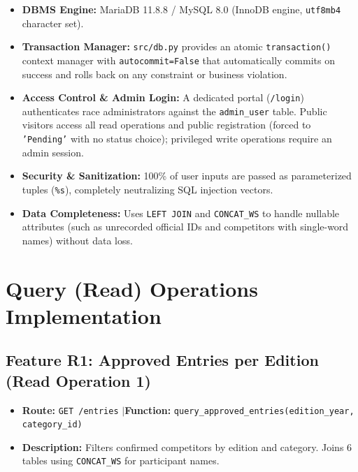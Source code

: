 \documentclass[11pt,a4paper]{article}
\begin{document}
\begin{tcolorbox}[colback=gray!5!white, colframe=darkgray, title=\textbf{Database Environment \& Connection Architecture}, fonttitle=\bfseries\small]
\small
\begin{itemize}[leftmargin=1.5em, itemsep=1.5pt, topsep=1pt]
  \item \textbf{DBMS Engine:} MariaDB 11.8.8 / MySQL 8.0 (InnoDB engine, \texttt{utf8mb4} character set).
  \item \textbf{Transaction Manager:} \texttt{src/db.py} provides an atomic \texttt{transaction()} context manager with \texttt{autocommit=False} that automatically commits on success and rolls back on any constraint or business violation.
  \item \textbf{Access Control \& Admin Login:} A dedicated portal (\texttt{/login}) authenticates race administrators against the \texttt{admin\_user} table. Public visitors access all read operations and public registration (forced to \texttt{'Pending'} with no status choice); privileged write operations require an admin session.
  \item \textbf{Security \& Sanitization:} 100\% of user inputs are passed as parameterized tuples (\texttt{\%s}), completely neutralizing SQL injection vectors.
  \item \textbf{Data Completeness:} Uses \texttt{LEFT JOIN} and \texttt{CONCAT\_WS} to handle nullable attributes (such as unrecorded official IDs and competitors with single-word names) without data loss.
\end{itemize}
\end{tcolorbox}

\newpage

\section{Query (Read) Operations Implementation}

\subsection{Feature R1: Approved Entries per Edition (Read Operation 1)}
\begin{itemize}[leftmargin=1.5em, itemsep=0.5pt, topsep=0.5pt]
  \item \textbf{Route:} \texttt{GET /entries} \quad$\vert$\quad \textbf{Function:} \texttt{query\_approved\_entries(edition\_year, category\_id)}
  \item \textbf{Description:} Filters confirmed competitors by edition and category. Joins 6 tables using \texttt{CONCAT\_WS} for participant names.
\end{itemize}
\end{document}
